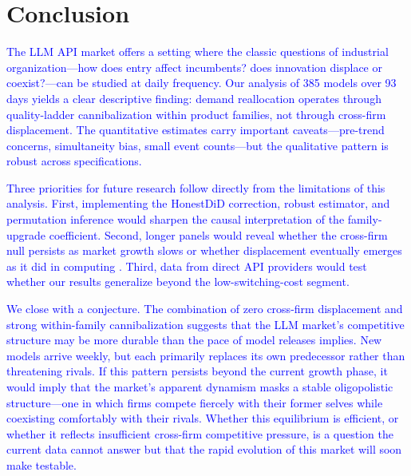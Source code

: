 \documentclass[11pt, a4paper]{article}
\begin{document}
\section{Conclusion}
\label{sec:conclusion}

\textcolor{blue}{The LLM API market offers a setting where the classic questions of industrial organization---how does entry affect incumbents? does innovation displace or coexist?---can be studied at daily frequency. Our analysis of 385 models over 93 days yields a clear descriptive finding: demand reallocation operates through quality-ladder cannibalization within product families, not through cross-firm displacement. The quantitative estimates carry important caveats---pre-trend concerns, simultaneity bias, small event counts---but the qualitative pattern is robust across specifications.}

\textcolor{blue}{Three priorities for future research follow directly from the limitations of this analysis. First, implementing the \citet{roth2022pretest} HonestDiD correction, \citet{sunAbraham2021} robust estimator, and permutation inference would sharpen the causal interpretation of the family-upgrade coefficient. Second, longer panels would reveal whether the cross-firm null persists as market growth slows or whether displacement eventually emerges as it did in computing \citep{bresnahan1999technological}. Third, data from direct API providers would test whether our results generalize beyond the low-switching-cost segment.}

\textcolor{blue}{We close with a conjecture. The combination of zero cross-firm displacement and strong within-family cannibalization suggests that the LLM market's competitive structure may be more durable than the pace of model releases implies. New models arrive weekly, but each primarily replaces its own predecessor rather than threatening rivals. If this pattern persists beyond the current growth phase, it would imply that the market's apparent dynamism masks a stable oligopolistic structure---one in which firms compete fiercely with their former selves while coexisting comfortably with their rivals. Whether this equilibrium is efficient, or whether it reflects insufficient cross-firm competitive pressure, is a question the current data cannot answer but that the rapid evolution of this market will soon make testable.}

\singlespacing

\end{document}
